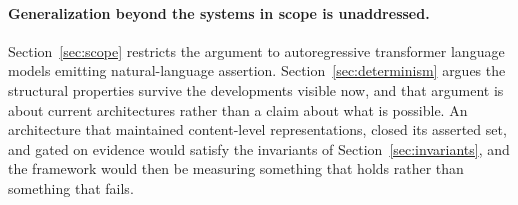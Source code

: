 \paragraph{Generalization beyond the systems in scope is unaddressed.}
Section~\ref{sec:scope} restricts the argument to autoregressive transformer language
models emitting natural-language assertion. Section~\ref{sec:determinism} argues the
structural properties survive the developments visible now, and that argument is about
current architectures rather than a claim about what is possible. An architecture that
maintained content-level representations, closed its asserted set, and gated on evidence
would satisfy the invariants of Section~\ref{sec:invariants}, and the framework would
then be measuring something that holds rather than something that fails.
